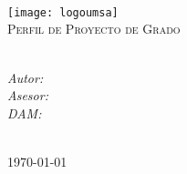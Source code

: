 \begin{titlepage}
	\begin{center}		
		\textsc{\LARGE {\myUniversity}}\\[0.5cm] 
		\textsc{\Large{\myFaculty}}\\[0.5cm]
		\textsc{\large{\myDepartment}}\\[1cm]	
		\texttt{[image: logoumsa]}\\[1cm] 		
		\textsc{\LARGE Perfil de Proyecto de Grado}\\[1.5cm]
		\textsc{\Large \myTitle}\\[2cm]									
		\begin{minipage}{0.8\textwidth}
			\begin{flushleft} 
				\large\textit{Autor:}\quad\myAuthorName\\[0.5cm]
				\large\textit{Asesor:}\quad\myAsesorName\\[0.5cm]
				\large\textit{DAM:}\quad\ \mySupervisorName\\[0.5cm]
			\end{flushleft}
		\end{minipage}\\[2cm]	
		\today	
		\vfill
	\end{center}	
\end{titlepage}
